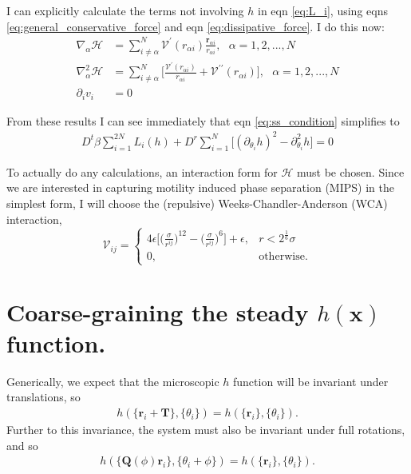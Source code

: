 \documentclass{article}
\begin{document}
I can explicitly calculate the terms not involving $h$ in eqn \ref{eq:L_i}, using eqns
\ref{eq:general_conservative_force} and eqn \ref{eq:dissipative_force}. I do this now:
\begin{subequations}
  \label{eqs:partials_of_L_i}
  \begin{align}
    \nabla_{\alpha}\mathcal{H}
    &=\sum_{i\neq\alpha}^N\mathcal{V}^{\prime}
      (r_{\alpha i})\frac{\bm{r}_{\alpha i}}{r_{\alpha i}},
      \:\:\:\alpha=1,2,...,N\label{eq:partial_H_of_L_i}\\
    \nabla_{\alpha}^2\mathcal{H}
    &=\sum_{i\neq\alpha}^N\bigg[\frac{\mathcal{V}^{\prime}(r_{\alpha i})}{r_{\alpha i}}
      +\mathcal{V}^{\prime\prime}(r_{\alpha i})\bigg],
      \:\:\:\alpha=1,2,...,N\label{eq:partialsq_H_of_L_i}\\
    \partial_i v_i
    &= 0\label{eq:partial_v_of_L_i}
  \end{align}
\end{subequations}

From these results I can see immediately that eqn \ref{eq:ss_condition} simplifies to
\begin{align}\label{eq:steadystatecondition}
  D^t\beta\sum_{i=1}^{2N}L_i(h)+D^r\sum_{i=1}^{N}\big[(\partial_{\theta_i}h)^2
  -\partial_{\theta_i}^2h\big]=0
\end{align}

To actually do any calculations, an interaction form for $\mathcal{H}$ must be chosen. Since we
are interested in capturing motility induced phase separation (MIPS) in the simplest form, I
will choose the (repulsive) Weeks-Chandler-Anderson (WCA) interaction,
\begin{equation}\label{eq:WCAapprox}
  \mathcal{V}_{ij} =
  \begin{cases}
    4\epsilon\bigg[\bigg(\frac{\sigma}{r^{ij}}\bigg)^{12}
    -\bigg(\frac{\sigma}{r^{ij}}\bigg)^6\bigg]+\epsilon, & r<2^{\frac{1}{6}}\sigma \\
    0, & \mathrm{otherwise}.
  \end{cases}
\end{equation}

\newpage
\section{Coarse-graining the steady $h(\bm{x})$ function.}

Generically, we expect that the microscopic $h$ function will be invariant under translations,
so
\begin{align}
  h(\{\bm{r}_i+\bm{T}\},\{\theta_i\}) = h(\{\bm{r}_i\},\{\theta_i\}).
\end{align}
Further to this invariance, the system must also be invariant
under full rotations, and so
\begin{align}
  h(\{\bm{Q}(\phi)\bm{r}_i\},\{\theta_i+\phi\})
  =h(\{\bm{r}_i\},\{\theta_i\}).
\end{align}
\end{document}
